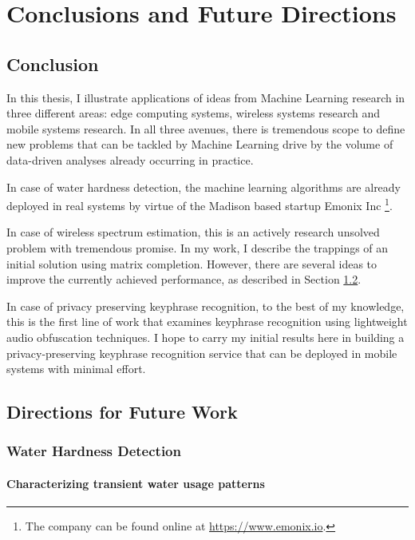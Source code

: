 \chapter{Conclusions and Future Directions}
\label{chap:conclusion}

\section{Conclusion}

In this thesis, I illustrate applications of ideas from Machine Learning research in three different areas: edge computing systems, wireless systems research and mobile systems research.
 In all three avenues, there is tremendous scope to define new problems that can be tackled by Machine Learning drive by the volume of data-driven analyses already occurring in practice.


In case of water hardness detection, the machine learning algorithms are already deployed in real systems by virtue of the Madison based startup Emonix Inc \footnote{The company can be found online at \url{https://www.emonix.io}.}.


In case of wireless spectrum estimation, this is an actively research unsolved problem with tremendous promise.
 In my work, I describe the trappings of an initial solution using matrix completion.
 However, there are several ideas to improve the currently achieved performance, as described in Section \ref{sec:futureWork}.


In case of privacy preserving keyphrase recognition, to the best of my knowledge, this is the first line of work that examines keyphrase recognition using lightweight audio obfuscation techniques.
 I hope to carry my initial results here in building a privacy-preserving keyphrase recognition service that can be deployed in mobile systems with minimal effort.

\section{Directions for Future Work}
\label{sec:futureWork}

\subsection{Water Hardness Detection}

\subsubsection{Characterizing transient water usage patterns}

